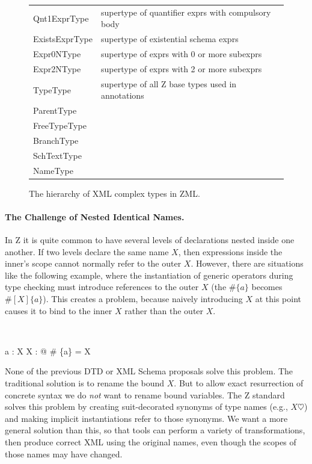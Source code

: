 \documentclass{llncs}  %
\begin{document}
\begin{figure}[htb]
\begin{scriptsize}
\begin{tabular}{ll}
\I\I\I\I  Qnt1ExprType    &supertype of quantifier exprs with compulsory body\\
\I\I\I\I\I  ExistsExprType &supertype of existential schema exprs\\
\I\I\I  Expr0NType        &supertype of exprs with 0 or more subexprs\\
\I\I\I\I  Expr2NType      &supertype of exprs with 2 or more subexprs\\
\I\I  TypeType            &supertype of all Z base types used in annotations\\
\I\I  ParentType          &\\
\I\I  FreeTypeType        &\\
\I\I  BranchType          &\\
\I\I  SchTextType         &\\
\I\I  NameType            &\\
\end{tabular}
\end{scriptsize}
\caption{The hierarchy of XML complex types in ZML.}
\label{fig:hier}
\end{figure}


\paragraph{The Challenge of Nested Identical Names.}

In Z it is quite common to have several levels of declarations nested 
inside one another.  If two levels declare the same name $X$, then
expressions inside the inner's scope cannot normally refer to the outer $X$.
However, there are situations like the following example, where the
instantiation of generic operators during type checking must
introduce references to the outer $X$ (the $\# \{a\}$ becomes
$\#[X]\{a\}$). This creates a problem, because naively introducing
$X$ at this point causes it to bind to the inner $X$ rather than 
the outer $X$. 
\begin{zed}
    [X] \\
\end{zed}
\begin{axdef}
    a : X
\where
    \exists X : \nat @ \# \{a\} = X
\end{axdef}


None of the previous DTD or XML Schema proposals solve this problem.  The
traditional solution is to rename the bound $X$.  But to allow exact
resurrection of concrete syntax we do \emph{not} want to rename bound
variables.  The Z standard solves this problem by creating suit-decorated
synonyms of type names (e.g., $X\heartsuit$) and making implicit
instantiations refer to those synonyms.  We want a
more general solution than this, so that tools can perform a variety of
transformations, then produce correct XML using the original names, even
though the scopes of those names may have changed.
\end{document}
